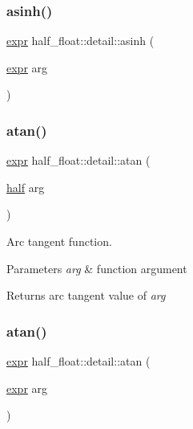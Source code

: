 \subsubsection{\texorpdfstring{asinh()}{asinh()}\hspace{0.1cm}{\footnotesize\ttfamily [2/2]}}
{\footnotesize\ttfamily \hyperlink{structhalf__float_1_1detail_1_1expr}{expr} half\+\_\+float\+::detail\+::asinh (\begin{DoxyParamCaption}\item[{\hyperlink{structhalf__float_1_1detail_1_1expr}{expr}}]{arg }\end{DoxyParamCaption})\hspace{0.3cm}{\ttfamily [inline]}}

\mbox{\label{namespacehalf__float_1_1detail_a70ee2b0c4152c8633270faa7b5c5158c}} 
\subsubsection{\texorpdfstring{atan()}{atan()}\hspace{0.1cm}{\footnotesize\ttfamily [1/2]}}
{\footnotesize\ttfamily \hyperlink{structhalf__float_1_1detail_1_1expr}{expr} half\+\_\+float\+::detail\+::atan (\begin{DoxyParamCaption}\item[{\hyperlink{classhalf__float_1_1half}{half}}]{arg }\end{DoxyParamCaption})\hspace{0.3cm}{\ttfamily [inline]}}

Arc tangent function. 
\begin{DoxyParams}{Parameters}
{\em arg} & function argument \\
\hline
\end{DoxyParams}
\begin{DoxyReturn}{Returns}
arc tangent value of {\itshape arg} 
\end{DoxyReturn}
\mbox{\label{namespacehalf__float_1_1detail_ab90ceee4ff49e1bc2f733112837cd03b}} 
\subsubsection{\texorpdfstring{atan()}{atan()}\hspace{0.1cm}{\footnotesize\ttfamily [2/2]}}
{\footnotesize\ttfamily \hyperlink{structhalf__float_1_1detail_1_1expr}{expr} half\+\_\+float\+::detail\+::atan (\begin{DoxyParamCaption}\item[{\hyperlink{structhalf__float_1_1detail_1_1expr}{expr}}]{arg }\end{DoxyParamCaption})\hspace{0.3cm}{\ttfamily [inline]}}

